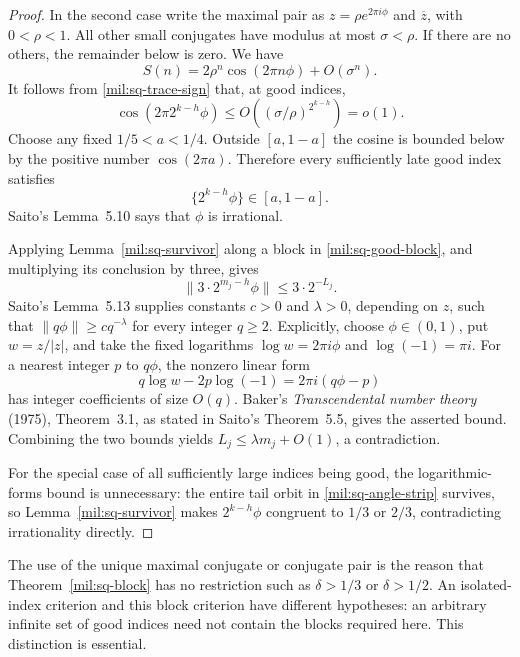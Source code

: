 \documentclass[11pt,a4paper]{article}
\theoremstyle{definition}
\theoremstyle{remark}
\numberwithin{equation}{section}
\begin{document}
\begin{proof}
In the second case write the maximal pair as
$z=\rho e^{2\pi i\phi}$ and $\overline z$, with $0<\rho<1$.
All other small conjugates have modulus at most $\sigma<\rho$.
If there are no others, the remainder below is zero. We have
\[
 S(n)=2\rho^n\cos(2\pi n\phi)+O(\sigma^n).
\]
It follows from \eqref{mil:sq-trace-sign} that, at good indices,
\[
 \cos(2\pi 2^{k-h}\phi)\le O((\sigma/\rho)^{2^{k-h}})=o(1).
\]
Choose any fixed $1/5<a<1/4$. Outside $[a,1-a]$ the cosine
is bounded below by the positive number $\cos(2\pi a)$.
Therefore every sufficiently late good index satisfies
\begin{equation}\label{mil:sq-angle-strip}
 \{2^{k-h}\phi\}\in[a,1-a].
\end{equation}
Saito's Lemma~5.10 says that $\phi$ is irrational.

Applying Lemma~\ref{mil:sq-survivor} along a block in
\eqref{mil:sq-good-block}, and multiplying its conclusion by three,
gives
\[
 \|3\cdot2^{m_j-h}\phi\|\le3\cdot2^{-L_j}.
\]
Saito's Lemma~5.13 supplies constants $c>0$ and $\lambda>0$,
depending on $z$, such that $\|q\phi\|\ge c q^{-\lambda}$
for every integer $q\ge2$. Explicitly, choose $\phi\in(0,1)$,
put $w=z/|z|$, and take the fixed logarithms
$\log w=2\pi i\phi$ and $\log(-1)=\pi i$. For a nearest integer
$p$ to $q\phi$, the nonzero linear form
\[
 q\log w-2p\log(-1)=2\pi i(q\phi-p)
\]
has integer coefficients of size $O(q)$. Baker's
\emph{Transcendental number theory} (1975), Theorem~3.1,
as stated in Saito's Theorem~5.5, gives the asserted bound.
Combining the two bounds yields
$L_j\le\lambda m_j+O(1)$, a contradiction.

For the special case of all sufficiently large indices being
good, the logarithmic-forms bound is unnecessary: the entire
tail orbit in \eqref{mil:sq-angle-strip} survives, so
Lemma~\ref{mil:sq-survivor} makes $2^{k-h}\phi$ congruent to $1/3$
or $2/3$, contradicting irrationality directly.
\end{proof}

The use of the unique maximal conjugate or conjugate pair is the
reason that Theorem~\ref{mil:sq-block} has no restriction such as
$\delta>1/3$ or $\delta>1/2$. An isolated-index criterion and this block criterion have different
hypotheses: an arbitrary infinite set of good indices need not contain
the blocks required here. This distinction is essential.
\end{document}
